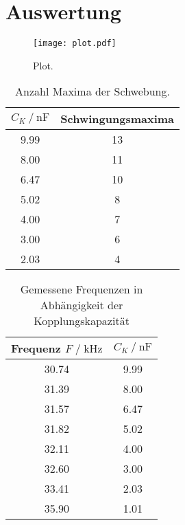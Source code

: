 \section{Auswertung}
\label{sec:Auswertung}

\begin{figure}
  \centering
  \texttt{[image: plot.pdf]}
  \caption{Plot.}
  \label{fig:plot}
\end{figure}

\begin{table}
  \centering
  \caption{Anzahl Maxima der Schwebung.}
  \label{tab:schwing_maxima}
  \begin{tabular}{c c}
      \toprule
      {$C_K \:/\: \si{\nano\farad}$} & Schwingungsmaxima \\
      \midrule
      9.99  & 13 \\ 
      8.00  & 11 \\ 
      6.47  & 10 \\ 
      5.02 & 8 \\ 
      4.00 & 7 \\
      3.00 & 6 \\
      2.03 & 4 \\ 
      \bottomrule
  \end{tabular}
\end{table}

\begin{table}
  \centering
  \caption{Gemessene Frequenzen in Abhängigkeit der Kopplungskapazität}
  \label{tab:frequenzen}
  \begin{tabular}{c c}
      \toprule
      {Frequenz $F\;/\; \si{\kilo\hertz}$} & {$C_K \:/\: \si{\nano\farad}$} \\
      \midrule
      30.74 & 9.99 \\
      31.39 & 8.00 \\
      31.57 & 6.47 \\
      31.82 & 5.02 \\
      32.11 & 4.00 \\
      32.60 & 3.00 \\
      33.41 & 2.03 \\
      35.90 & 1.01 \\
      \bottomrule
  \end{tabular}
\end{table}


